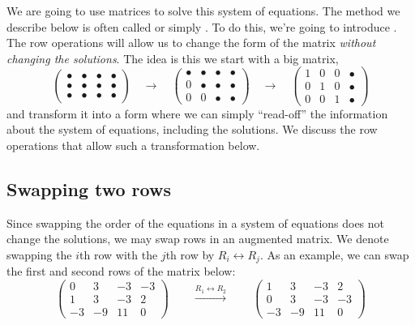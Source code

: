 \documentclass{ximera}
\begin{document}
We are going to use matrices to solve this system of equations. The
method we describe below is often called 
or simply . To do this, we're going to introduce
. The row operations will allow us to change the
form of the matrix \emph{without changing the solutions}. The idea is
this we start with a big matrix,
\[
  \begin{pmatrix}
    \bullet & \bullet & \bullet & \bullet \\
    \bullet & \bullet & \bullet & \bullet \\
    \bullet & \bullet & \bullet & \bullet
  \end{pmatrix}
  \quad \longrightarrow \quad
  \begin{pmatrix}
    \bullet & \bullet & \bullet & \bullet \\
    0 & \bullet & \bullet & \bullet \\
    0 & 0 & \bullet & \bullet
  \end{pmatrix}
  \quad \longrightarrow \quad
  \begin{pmatrix}
    1 & 0 & 0 & \bullet \\
    0 & 1 & 0 & \bullet \\
    0 & 0 & 1 & \bullet
  \end{pmatrix}
\]
and transform it into a form where we can simply ``read-off'' the
information about the system of equations, including the solutions.  We
discuss the row operations that allow such a transformation below.



\subsection{Swapping two rows}

Since swapping the order of the equations in a
system of equations does not change the solutions, we may swap rows
in an augmented matrix. We denote swapping the $i$th row with the
$j$th row by $R_i\leftrightarrow R_j$. As an example, we can swap
the first and second rows of the matrix below:
\[
  \left(
    \begin{array}{ccc|c}
      0 &   3 & -3 & -3 \\
      1 &   3 & -3 & 2  \\
      -3& -9  & 11 & 0
    \end{array}
  \right)
  \qquad
  \xrightarrow{R_1 \leftrightarrow R_2}
  \qquad
  \left(
    \begin{array}{ccc|c}
      1 &   3 & -3 & 2  \\
      0 &   3 & -3 & -3 \\
      -3& -9  & 11 & 0
    \end{array}
  \right)
\]
\end{document}
